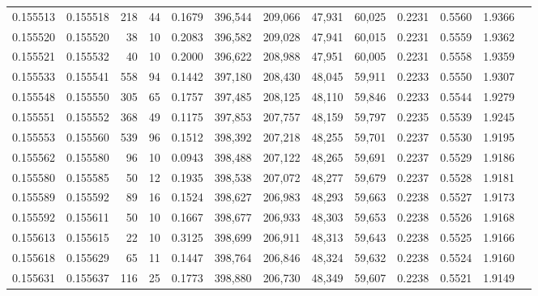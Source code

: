 \begin{tabular}{rrrrrrrrrrrrr}
0.155513 & 0.155518 &   218 &  44 &                                     0.1679 & 396,544 & 209,066 &  47,931 &  60,025 & 0.2231 & 0.5560 & 1.9366 \\
0.155520 & 0.155520 &    38 &  10 &                                     0.2083 & 396,582 & 209,028 &  47,941 &  60,015 & 0.2231 & 0.5559 & 1.9362 \\
0.155521 & 0.155532 &    40 &  10 &                                     0.2000 & 396,622 & 208,988 &  47,951 &  60,005 & 0.2231 & 0.5558 & 1.9359 \\
0.155533 & 0.155541 &   558 &  94 &                                     0.1442 & 397,180 & 208,430 &  48,045 &  59,911 & 0.2233 & 0.5550 & 1.9307 \\
0.155548 & 0.155550 &   305 &  65 &                                     0.1757 & 397,485 & 208,125 &  48,110 &  59,846 & 0.2233 & 0.5544 & 1.9279 \\
0.155551 & 0.155552 &   368 &  49 &                                     0.1175 & 397,853 & 207,757 &  48,159 &  59,797 & 0.2235 & 0.5539 & 1.9245 \\
0.155553 & 0.155560 &   539 &  96 &                                     0.1512 & 398,392 & 207,218 &  48,255 &  59,701 & 0.2237 & 0.5530 & 1.9195 \\
0.155562 & 0.155580 &    96 &  10 &                                     0.0943 & 398,488 & 207,122 &  48,265 &  59,691 & 0.2237 & 0.5529 & 1.9186 \\
0.155580 & 0.155585 &    50 &  12 &                                     0.1935 & 398,538 & 207,072 &  48,277 &  59,679 & 0.2237 & 0.5528 & 1.9181 \\
0.155589 & 0.155592 &    89 &  16 &                                     0.1524 & 398,627 & 206,983 &  48,293 &  59,663 & 0.2238 & 0.5527 & 1.9173 \\
0.155592 & 0.155611 &    50 &  10 &                                     0.1667 & 398,677 & 206,933 &  48,303 &  59,653 & 0.2238 & 0.5526 & 1.9168 \\
0.155613 & 0.155615 &    22 &  10 &                                     0.3125 & 398,699 & 206,911 &  48,313 &  59,643 & 0.2238 & 0.5525 & 1.9166 \\
0.155618 & 0.155629 &    65 &  11 &                                     0.1447 & 398,764 & 206,846 &  48,324 &  59,632 & 0.2238 & 0.5524 & 1.9160 \\
0.155631 & 0.155637 &   116 &  25 &                                     0.1773 & 398,880 & 206,730 &  48,349 &  59,607 & 0.2238 & 0.5521 & 1.9149 \\

\end{tabular}
